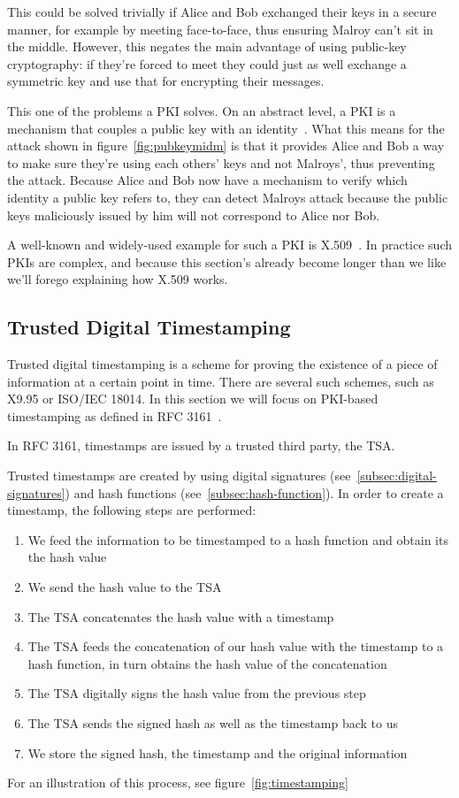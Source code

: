 This could be solved trivially if Alice and Bob exchanged their keys in a secure manner,
for example by meeting face-to-face,
thus ensuring Malroy can't sit in the middle.
However, this negates the main advantage of using public-key cryptography:
if they're forced to meet they could just as well exchange a symmetric key and use that for encrypting
their messages.

This one of the problems a \gls{PKI} solves.
On an abstract level, a \gls{PKI} is a mechanism that couples a public key with an identity~\cite{whatispki}.
What this means for the attack shown in figure~\ref{fig:pubkeymidm} is that it provides Alice and Bob
a way to make sure they're using each others' keys and not Malroys',
thus preventing the attack.
Because Alice and Bob now have a mechanism to verify which identity a public key refers to,
they can detect Malroys attack because the public keys maliciously issued by him will not correspond to Alice nor Bob.

A well-known and widely-used example for such a \gls{PKI} is X.509~\cite{x509}.
In practice such \gls{PKI}s are complex,
and because this section's already become longer than we like we'll forego explaining how X.509 works.

\subsection{Trusted Digital Timestamping}\label{subsec:timestamps}
Trusted digital timestamping is a scheme for proving the existence of a piece of information at a certain point in time.
There are several such schemes, such as X9.95 or ISO/IEC 18014.
In this section we will focus on \gls{PKI}-based timestamping as defined in RFC 3161~\cite{rfc3161}.

In RFC 3161, timestamps are issued by a trusted third party, the \acrfull{TSA}.

Trusted timestamps are created by using digital signatures (see~\ref{subsec:digital-signatures}) and hash functions (see~\ref{subsec:hash-function}).
In order to create a timestamp, the following steps are performed:
\begin{enumerate}
    \item We feed the information to be timestamped to a hash function and obtain its the hash value
    \item We send the hash value to the \gls{TSA}
    \item The \gls{TSA} concatenates the hash value with a timestamp
    \item The \gls{TSA} feeds the concatenation of our hash value with the timestamp to a hash function, in turn obtains the hash value of the concatenation
    \item The \gls{TSA} digitally signs the hash value from the previous step
    \item The \gls{TSA} sends the signed hash as well as the timestamp back to us
    \item We store the signed hash, the timestamp and the original information
\end{enumerate}
For an illustration of this process, see figure~\ref{fig:timestamping}

